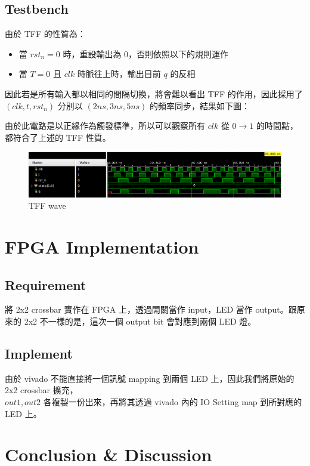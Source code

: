 \documentclass[10.5pt,compsoc,UTF8]{CjC}
\theoremstyle{mystyle}
\begin{document}
\subsection{Testbench}

由於 TFF 的性質為：
\begin{itemize}
    \item 當 $rst_n = 0$ 時，重設輸出為 $0$，否則依照以下的規則運作
    \item 當 $T = 0$ 且 $clk$ 時脈往上時，輸出目前 $q$ 的反相
\end{itemize}

因此若是所有輸入都以相同的間隔切換，將會難以看出 TFF 的作用，因此採用了 $(clk, t, rst_n)$ 分別以 $(2ns, 3ns, 5ns)$ 的頻率同步，結果如下圖：
\par
由於此電路是以正緣作為觸發標準，所以可以觀察所有 $clk$ 從 $0 \rightarrow 1$ 的時間點，都符合了上述的 TFF 性質。

\begin{figure}[h]
    \centering
    \includegraphics[width=\textwidth]{TFF_wave.png}
      \caption{TFF wave}
    \label{fig:TFF_wave}
\end{figure}

\section{FPGA Implementation}

\subsection{Requirement}
將 2x2 crossbar 實作在 FPGA 上，透過開關當作 input，LED 當作 output。跟原來的 2x2 不一樣的是，這次一個 output bit 會對應到兩個 LED 燈。

\subsection{Implement}
由於 vivado 不能直接將一個訊號 mapping 到兩個 LED 上，因此我們將原始的 2x2 crossbar 擴充，\\
$out1, out2$ 各複製一份出來，再將其透過 vivado 內的 IO Setting map 到所對應的 LED 上。

\section{Conclusion \& Discussion}
\end{document}
